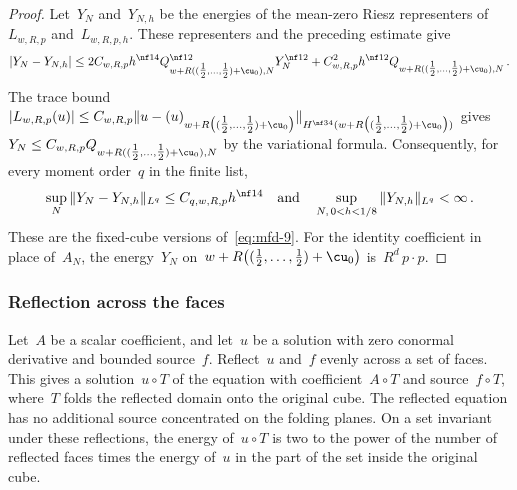 \documentclass[11pt]{amsart}
\begin{document}
\begin{proof}
Let~$Y_N$ and~$Y_{N,h}$ be the energies of the mean-zero Riesz representers of~$L_{w,R,p}$ and~$L_{w,R,p,h}$. These representers and the preceding estimate give
\begin{equation*}
	|Y_N-Y_{N,h}|
	\leq 2C_{w,R,p}h^{\nf14}Q_{w+R((\tfrac12,\dots,\tfrac12)+\cu_0),N}^{\nf12}Y_N^{\nf12}
	+C_{w,R,p}^2h^{\nf12}Q_{w+R((\tfrac12,\dots,\tfrac12)+\cu_0),N}\,.
\end{equation*}
The trace bound~$|L_{w,R,p}(u)|\leq C_{w,R,p}\|u-(u)_{w+R\bigl((\tfrac12,\dots,\tfrac12)+\cu_0\bigr)}\|_{H^{\nf34}(w+R\bigl((\tfrac12,\dots,\tfrac12)+\cu_0\bigr))}$ gives~$Y_N\leq C_{w,R,p}Q_{w+R((\tfrac12,\dots,\tfrac12)+\cu_0),N}$ by the variational formula. Consequently, for every moment order~$q$ in the finite list,
\begin{equation*}
	\sup_N\|Y_N-Y_{N,h}\|_{L^q}\leq C_{q,w,R,p}h^{\nf14}\quad\text{and}\quad
	\sup_{N,\,0<h<1/8}\|Y_{N,h}\|_{L^q}<\infty\,.
\end{equation*}
These are the fixed-cube versions of~\eqref{eq:mfd-9}. For the identity coefficient in place of~$A_N$, the energy~$Y_N$ on~$w+R\bigl((\tfrac12,\dots,\tfrac12)+\cu_0\bigr)$ is~$R^d\,p\cdot p$.
\end{proof}

\subsubsection{Reflection across the faces}

Let~$A$ be a scalar coefficient, and let~$u$ be a solution with zero conormal derivative and bounded source~$f$. Reflect~$u$ and~$f$ evenly across a set of faces. This gives a solution~$u\circ T$ of the equation with coefficient~$A\circ T$ and source~$f\circ T$, where~$T$ folds the reflected domain onto the original cube. The reflected equation has no additional source concentrated on the folding planes. On a set invariant under these reflections, the energy of~$u\circ T$ is two to the power of the number of reflected faces times the energy of~$u$ in the part of the set inside the original cube.
\end{document}
